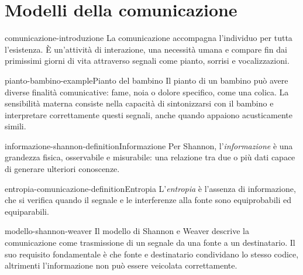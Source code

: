 \documentclass[preview]{standalone}
\begin{document}
\genpage

\section{Modelli della comunicazione}

\begin{snippet}{comunicazione-introduzione}
    La comunicazione accompagna l'individuo per tutta l'esistenza. È un'attività
    di interazione, una necessità umana e compare fin dai primissimi giorni di
    vita attraverso segnali come pianto, sorrisi e vocalizzazioni.
\end{snippet}

\begin{snippetexample}{pianto-bambino-example}{Pianto del bambino}
    Il pianto di un bambino può avere diverse finalità comunicative: fame, noia
    o dolore specifico, come una colica. La sensibilità materna consiste nella
    capacità di sintonizzarsi con il bambino e interpretare correttamente questi
    segnali, anche quando appaiono acusticamente simili.
\end{snippetexample}

\begin{snippetdefinition}{informazione-shannon-definition}{Informazione}
    Per Shannon, l'\emph{informazione} è una grandezza fisica, osservabile e
    misurabile: una relazione tra due o più dati capace di generare ulteriori
    conoscenze.
\end{snippetdefinition}

\begin{snippetdefinition}{entropia-comunicazione-definition}{Entropia}
    L'\emph{entropia} è l'assenza di informazione, che si verifica quando il
    segnale e le interferenze alla fonte sono equiprobabili ed equiparabili.
\end{snippetdefinition}

\begin{snippet}{modello-shannon-weaver}
    Il modello di Shannon e Weaver descrive la comunicazione come trasmissione
    di un segnale da una fonte a un destinatario. Il suo requisito fondamentale
    è che fonte e destinatario condividano lo stesso codice, altrimenti
    l'informazione non può essere veicolata correttamente.
\end{snippet}

\end{document}
